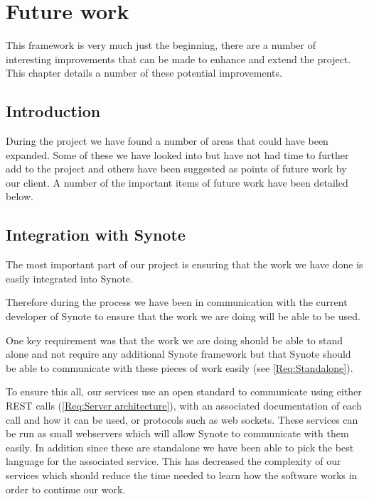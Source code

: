 \chapter{Future work} \label{Chapter: Future Work}

\begin{preamble}
This framework is very much just the beginning, there are a number of interesting improvements that can be made to enhance and extend the project. This chapter details a number of these potential improvements.
\end{preamble}

\section{Introduction}

During the project we have found a number of areas that could have been expanded. Some of these we have looked into but have not had time to further add to the project and others have been suggested as points of future work by our client. A number of the important items of future work have been detailed below.

\section{Integration with Synote}

The most important part of our project is ensuring that the work we have done is easily integrated into Synote.

Therefore during the process we have been in communication with the current developer of Synote to ensure that the work we are doing will be able to be used.

One key requirement was that the work we are doing should be able to stand alone and not require any additional Synote framework but that Synote should be able to communicate with these pieces of work easily (see \cref{Req:Standalone}).

To ensure this all, our services use an open standard to communicate using either \gls{REST} calls (\cref{Req:Server architecture}), with an associated documentation of each call and how it can be used, or protocols such as web sockets. These services can be run as small webservers which will allow Synote to communicate with them easily. In addition since these are standalone we have been able to pick the best language for the associated service. This has decreased the complexity of our services which should reduce the time needed to learn how the software works in order to continue our work.


